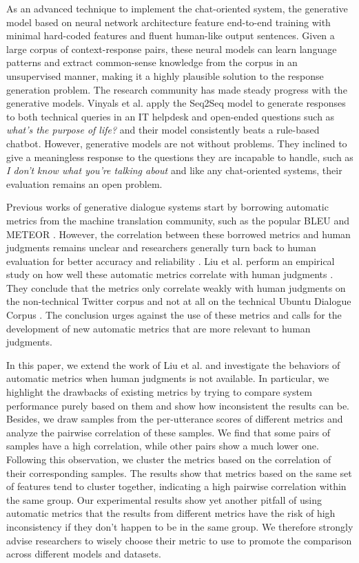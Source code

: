 \documentclass[runningheads]{llncs}
\begin{document}
    As an advanced technique to implement the chat-oriented system, the generative model based on neural network architecture feature end-to-end training with minimal hard-coded features and fluent human-like output sentences. Given a large corpus of context-response pairs, these neural models can learn language patterns and extract common-sense knowledge from the corpus in an unsupervised manner, making it a highly plausible solution to the response generation problem. The research community has made steady progress with the generative models. Vinyals et al. \cite{GoogleChatbot} apply the Seq2Seq model \cite{Seq2Seq} to generate responses to both technical queries in an IT helpdesk and open-ended questions such as \textit{what's the purpose of life?} and their model consistently beats a rule-based chatbot. However, generative models are not without problems. They inclined to give a meaningless response to the questions they are incapable to handle, such as \textit{I don't know what you're talking about} and like any chat-oriented systems, their evaluation remains an open problem.

    Previous works of generative dialogue systems start by borrowing automatic metrics from the machine translation community, such as the popular BLEU \cite{BLEU} and METEOR \cite{METEOR}. However, the correlation between these borrowed metrics and human judgments remains unclear and researchers generally turn back to human evaluation for better accuracy and reliability \cite{Shang,DCGM,VHRED}. Liu et al. perform an empirical study on how well these automatic metrics correlate with human judgments \cite{HowNot}. They conclude that the metrics only correlate weakly with human judgments on the non-technical Twitter corpus and not at all on the technical Ubuntu Dialogue Corpus \cite{ubuntu_corpus}. The conclusion urges against the use of these metrics and calls for the development of new automatic metrics that are more relevant to human judgments.

    In this paper, we extend the work of Liu et al. and investigate the behaviors of automatic metrics when human judgments is not available. In particular, we highlight the drawbacks of existing metrics by trying to compare system performance purely based on them and show how inconsistent the results can be. Besides, we draw samples from the per-utterance scores of different metrics and analyze the pairwise correlation of these samples. We find that some pairs of samples have a high correlation, while other pairs show a much lower one. Following this observation, we cluster the metrics based on the correlation of their corresponding samples. The results show that metrics based on the same set of features tend to cluster together, indicating a high pairwise correlation within the same group. Our experimental results show yet another pitfall of using automatic metrics that the results from different metrics have the risk of high inconsistency if they don't happen to be in the same group. We therefore strongly advise researchers to wisely choose their metric to use to promote the comparison across different models and datasets.
\end{document}
